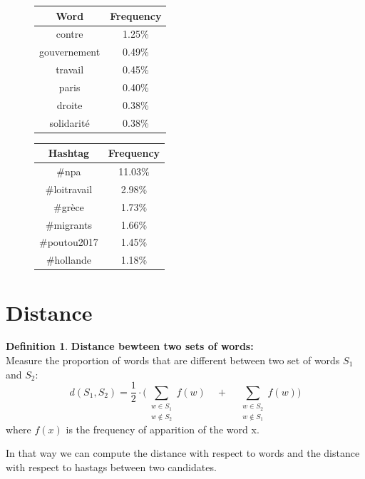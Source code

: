 \documentclass[a4paper]{article}
\theoremstyle{definition}
\newtheorem{definition}{Definition}[section]
\begin{document}
\begin{figure}
\begin{center}
\begin{multicols}{2}
\begin{tabular}{ | c | c |}
\hline Word & Frequency\\
\hline
contre & 1.25\%\\
gouvernement & 0.49\%\\
travail & 0.45\%\\
paris & 0.40\%\\
droite & 0.38\%\\
solidarité &  0.38\%\\
\hline
\end{tabular}

\begin{tabular}{ | c | c |}
\hline Hashtag & Frequency\\
\hline
\#npa & 11.03\%\\
\#loitravail & 2.98\%\\
\#grèce & 1.73\%\\
\#migrants & 1.66\%\\
\#poutou2017 & 1.45\%\\
\#hollande & 1.18\%\\
\hline
\end{tabular}
\end{multicols}
\bigskip
{}
\end{center}
\end{figure}

\section{Distance}
\theoremstyle{definition}
\begin{definition}{\bf Distance bewteen two sets of words:\\}
Measure the proportion of words that are different between two set of words $S_1$ and $S_2$:
\[
d(S_1, S_2)= \frac{1}{2} \cdot \Big( \sum_{\substack{w \in S_1\\w \notin S_2}}f(w) \quad + \quad \sum_{\substack{w \in S_2\\w \notin S_1}} f(w) \Big) 
\]
where $f(x)$ is the frequency of apparition of the word x.
\end{definition}

In that way we can compute the distance with respect to words and the distance with respect to hastags between two candidates.
\end{document}
